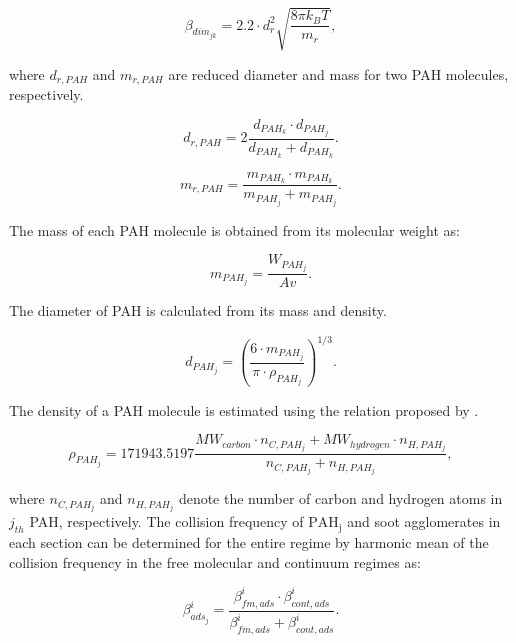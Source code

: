 \begin{equation}
	\beta_{dim_{jk}}=
	2.2 \cdot d^2_{r} \sqrt{\frac{8 \pi k_B T}{m_{r}}},
	\label{eqn:betadim}
\end{equation}

 \noindent where ${d_{r,PAH}}$ and ${m_{r,PAH}}$ are reduced diameter and mass for two PAH molecules, respectively.

\begin{equation}
	d_{r,PAH}=
	2\frac{d_{PAH_k}\cdot d_{PAH_j}}{d_{PAH_k}+d_{PAH_k}}.
	\label{eqn:drPAH}
\end{equation}

\begin{equation}
	m_{r,PAH}=
	\frac{m_{PAH_k}\cdot m_{PAH_k}}{m_{PAH_j}+ m_{PAH_j}}.
	\label{eqn:mrPAH}
\end{equation}

The mass of each PAH molecule is obtained from its molecular weight as:

\begin{equation}
	m_{PAH_j}=
	\frac{W_{PAH_j}}{Av}.
	\label{eqn:mPAH}
\end{equation}

The diameter of PAH is calculated from its mass and density.

\begin{equation}
	d_{PAH_j}=
	\left(
	\frac{6\cdot m_{PAH_j}}{\pi\cdot\rho_{PAH_j}}
	\right)^{1/3}.
	\label{eqn:dPAH}
\end{equation}

The density of a PAH molecule is estimated using the relation proposed by \citet{johansson2016formation}.

\begin{equation}
	\rho_{PAH_j}= 
	171943.5197
	\frac{MW_{carbon}\cdot n_{C,PAH_j}+MW_{hydrogen}\cdot n_{H,PAH_j}}
	{n_{C,PAH_j}+n_{H,PAH_j}},
	\label{eqn:rhoPAH}
\end{equation}

\noindent where ${n_{C,PAH_j}}$ and ${n_{H,PAH_j}}$ denote the number of carbon and hydrogen atoms in $j_{th}$ PAH, respectively. The collision frequency of $\mathrm{PAH_j}$ and soot agglomerates in each section can be determined for the entire regime by harmonic mean of the collision frequency in the free molecular and continuum regimes as:

\begin{equation}
	\beta^i_{ads_j}=
	\frac{\beta^i_{fm, ads}\cdot \beta^i_{cont, ads}}
	{\beta^i_{fm, ads}+\beta^i_{cont, ads}}.
	\label{eqn:betahmads}
\end{equation}

